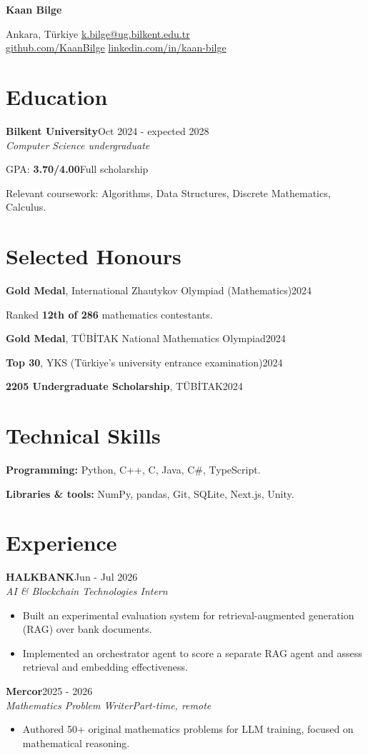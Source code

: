 \documentclass[10pt,a4paper]{article}
\newcommand{\entry}[3]{\textbf{#1}\hfill{\small #3}\\{\itshape #2}\par}
\newcommand{\gap}{\vspace{4pt}}
\newcommand{\award}[3]{\textbf{#1}, #2\hfill #3\par}
\begin{document}
\fontsize{10.5}{12.4}\selectfont
\color{ink}
\raggedright

{\fontsize{25}{28}\selectfont\bfseries Kaan Bilge}\par
\vspace{4pt}
{\small Ankara, T\"urkiye\enspace\textbar\enspace
\href{mailto:k.bilge@ug.bilkent.edu.tr}{k.bilge@ug.bilkent.edu.tr}\\[2pt]
\href{https://github.com/KaanBilge}{github.com/KaanBilge}\enspace\textbar\enspace
\href{https://www.linkedin.com/in/kaan-bilge}{linkedin.com/in/kaan-bilge}}\par

\section{Education}
\entry{Bilkent University}{Computer Science undergraduate}{Oct 2024 - expected 2028}
GPA: \textbf{3.70/4.00}\enspace\textbar\enspace Full scholarship\par
Relevant coursework: Algorithms, Data Structures, Discrete Mathematics, Calculus.

\section{Selected Honours}
\award{Gold Medal}{International Zhautykov Olympiad (Mathematics)}{2024}
Ranked \textbf{12th of 286} mathematics contestants.\par
\award{Gold Medal}{T\"UB\.{I}TAK National Mathematics Olympiad}{2024}
\award{Top 30}{YKS (T\"urkiye's university entrance examination)}{2024}
\award{2205 Undergraduate Scholarship}{T\"UB\.{I}TAK}{2024}

\section{Technical Skills}
\textbf{Programming:} Python, C++, C, Java, C\#, TypeScript.\par
\textbf{Libraries \& tools:} NumPy, pandas, Git, SQLite, Next.js, Unity.

\section{Experience}
\entry{HALKBANK}{AI \& Blockchain Technologies Intern}{Jun - Jul 2026}
\begin{itemize}
  \item Built an experimental evaluation system for retrieval-augmented generation (RAG) over bank documents.
  \item Implemented an orchestrator agent to score a separate RAG agent and assess retrieval and embedding effectiveness.
\end{itemize}
\gap
\entry{Mercor}{Mathematics Problem Writer\enspace\textbar\enspace Part-time, remote}{2025 - 2026}
\begin{itemize}
  \item Authored 50+ original mathematics problems for LLM training, focused on mathematical reasoning.
\end{itemize}
\end{document}
